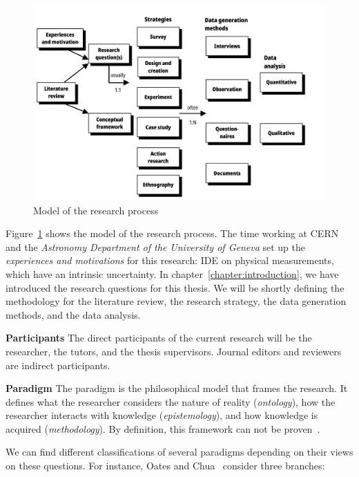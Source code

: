 \begin{figure}[htpb]
  \centering
  \includegraphics[width=\linewidth]{images/2_methodology/modelo_proceso}
  \caption[Model of the research process]{Model of the research process~\cite{Oates2006}}
  \label{fig:method_process_model}
\end{figure}

Figure~\ref{fig:method_process_model} shows the model of the research process.
The time working at \gls{CERN} and the \emph{Astronomy Department of the University of Geneva}
set up the \emph{experiences and motivations} for this research:
\gls{IDE} on physical measurements,
which have an intrinsic uncertainty. In chapter~\ref{chapter:introduction}, we have
introduced the research questions for this thesis.
We will be shortly defining the methodology for the literature review,
the research strategy, the data generation methods, and the data analysis.

\textbf{Participants}
\label{method:participants}
The direct participants of the current research will be the researcher, the tutors,
and the thesis supervisors. Journal editors and reviewers are indirect participants.

\textbf{Paradigm}
\label{method:paradigm}
The paradigm is the philosophical model that frames the research.
It defines what the researcher considers the nature
of reality (\emph{ontology}), how the researcher interacts with
knowledge (\emph{epistemology}), and how knowledge is acquired
(\emph{methodology}). By definition, this framework can not be proven~\cite{Guba1990,guba_competing_1994}.

We can find different classifications of several paradigms depending on
their views on these questions. For instance, Oates and Chua~\cite{Chua1986}
consider three branches:

